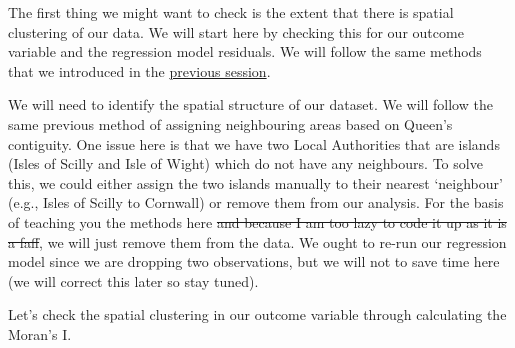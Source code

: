 \documentclass[
]{book}
\newenvironment{Shaded}{\begin{snugshade}}{\end{snugshade}}
\newcommand{\AttributeTok}[1]{\textcolor[rgb]{0.77,0.63,0.00}{#1}}
\newcommand{\CommentTok}[1]{\textcolor[rgb]{0.56,0.35,0.01}{\textit{#1}}}
\newcommand{\ConstantTok}[1]{\textcolor[rgb]{0.00,0.00,0.00}{#1}}
\newcommand{\FunctionTok}[1]{\textcolor[rgb]{0.00,0.00,0.00}{#1}}
\newcommand{\NormalTok}[1]{#1}
\newcommand{\OtherTok}[1]{\textcolor[rgb]{0.56,0.35,0.01}{#1}}
\newcommand{\SpecialCharTok}[1]{\textcolor[rgb]{0.00,0.00,0.00}{#1}}
\newcommand{\StringTok}[1]{\textcolor[rgb]{0.31,0.60,0.02}{#1}}
\begin{document}
The first thing we might want to check is the extent that there is spatial clustering of our data. We will start here by checking this for our outcome variable and the regression model residuals. We will follow the same methods that we introduced in the \protect\hyperlink{cluster}{previous session}.

We will need to identify the spatial structure of our dataset. We will follow the same previous method of assigning neighbouring areas based on Queen's contiguity. One issue here is that we have two Local Authorities that are islands (Isles of Scilly and Isle of Wight) which do not have any neighbours. To solve this, we could either assign the two islands manually to their nearest `neighbour' (e.g., Isles of Scilly to Cornwall) or remove them from our analysis. For the basis of teaching you the methods here \sout{and because I am too lazy to code it up as it is a faff}, we will just remove them from the data. We ought to re-run our regression model since we are dropping two observations, but we will not to save time here (we will correct this later so stay tuned).

Let's check the spatial clustering in our outcome variable through calculating the Moran's I.

\begin{Shaded}
\end{Shaded}
\end{document}
